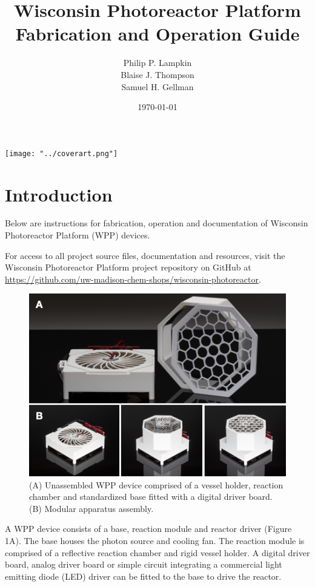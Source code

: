 \documentclass[11pt]{article}
\title{Wisconsin Photoreactor Platform\\Fabrication and Operation Guide}
\author{
  Philip P. Lampkin \\
  Blaise J. Thompson \\
  Samuel H. Gellman
  }
\date{\today}
\let\stdsection\section
\renewcommand\section{\clearpage\stdsection}
\begin{document}
\maketitle

\texttt{[image: "../coverart.png"]}

\tableofcontents

\section{Introduction}

Below are instructions for fabrication, operation and documentation of Wisconsin Photoreactor Platform (WPP) devices.

For access to all project source files, documentation and resources, visit the Wisconsin Photoreactor Platform project repository on GitHub at \href{https://github.com/uw-madison-chem-shops/wisconsin-photoreactor}{https://github.com/uw-madison-chem-shops/wisconsin-photoreactor}.

\begin{figure}[H]
	\includegraphics[width=\textwidth]{"./fig1.png"}
	\caption{(A) Unassembled WPP device comprised of a vessel holder, reaction chamber and standardized base fitted with a digital driver board. (B) Modular apparatus assembly.}
\end{figure}
A WPP device consists of a base, reaction module and reactor driver (Figure 1A).
The base houses the photon source and cooling fan.
The reaction module is comprised of a reflective reaction chamber and rigid vessel holder.
A digital driver board, analog driver board or simple circuit integrating a commercial light emitting diode (LED) driver can be fitted to the base to drive the reactor.
\end{document}
